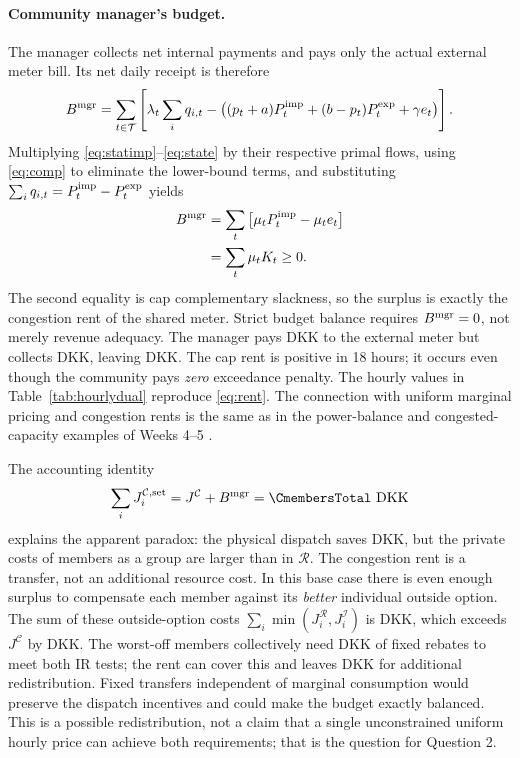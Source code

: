 \documentclass[10pt,a4paper]{article}
\newcommand{\Rmod}{\mathcal R}
\newcommand{\Imod}{\mathcal I}
\newcommand{\Cmod}{\mathcal C}
\newcommand{\DKK}{\mathrm{DKK}}
\begin{document}
\paragraph{Community manager's budget.}
The manager collects net internal payments and pays only the actual external meter bill. Its net daily receipt is therefore
\begin{equation}
B^{\rm mgr}=\sum_{t\in\mathcal T}
 \left[\lambda_t\sum_iq_{i,t}-
 \big((p_t+a)P_t^{\rm imp}+(b-p_t)P_t^{\rm exp}+\gamma e_t\big)\right].
\label{eq:budget}
\end{equation}
Multiplying \eqref{eq:statimp}--\eqref{eq:state} by their respective primal flows, using \eqref{eq:comp} to eliminate the lower-bound terms, and substituting $\sum_i q_{i,t}=P_t^{\rm imp}-P_t^{\rm exp}$ yields
\begin{equation}
\begin{split}
B^{\rm mgr}
&=\sum_t\big[\mu_t P_t^{\rm imp}-\mu_t e_t\big]\\
&=\sum_t\mu_t K_t\ge0.
\end{split}
\label{eq:rent}
\end{equation}
The second equality is cap complementary slackness, so the surplus is exactly the congestion rent of the shared meter. Strict budget balance requires $B^{\rm mgr}=0$, not merely revenue adequacy. The manager pays \Cbill{} DKK to the external meter but collects \Ccollections{} DKK, leaving \Crent{} DKK. The cap rent is positive in 18 hours; it occurs even though the community pays \emph{zero} exceedance penalty. The hourly values in Table~\ref{tab:hourlydual} reproduce \eqref{eq:rent}. The connection with uniform marginal pricing and congestion rents is the same as in the power-balance and congested-capacity examples of Weeks 4--5 \cite{week4,week5}.

The accounting identity
\begin{equation}
\sum_i J_i^{\Cmod,\rm set}=J^{\Cmod}+B^{\rm mgr}
=\CmembersTotal\ \DKK
\label{eq:memberaccount}
\end{equation}
explains the apparent paradox: the physical dispatch saves \Cgain{} DKK, but the private costs of members as a group are larger than in $\Rmod$. The congestion rent is a transfer, not an additional resource cost. In this base case there is even enough surplus to compensate each member against its \emph{better} individual outside option. The sum of these outside-option costs $\sum_i\min(J_i^\Rmod,J_i^\Imod)$ is \OutsideTotal{} DKK, which exceeds $J^\Cmod$ by \SurplusVsBest{} DKK. The worst-off members collectively need \RebateNeed{} DKK of fixed rebates to meet both IR tests; the rent can cover this and leaves \RebateRemainder{} DKK for additional redistribution. Fixed transfers independent of marginal consumption would preserve the dispatch incentives and could make the budget exactly balanced. This is a possible redistribution, not a claim that a single unconstrained uniform hourly price can achieve both requirements; that is the question for Question 2.
\end{document}
